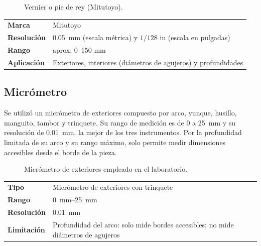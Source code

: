 \documentclass[12pt,a4paper]{article}
\begin{document}
\begin{figure}[H]
	\centering
	\caption{Vernier o pie de rey (Mitutoyo).}
\end{figure}

\begin{table}[!htb]
	\centering
	\small
	\begin{tabularx}{\linewidth}{>{\bfseries}l X}
		Marca      & Mitutoyo
		\\
		Resolución & \SI{0.05}{\milli\metre} (escala métrica) y $1/128$ in (escala
		en pulgadas)
		\\
		Rango      & aprox. 0--150 mm
		\\
		Aplicación & Exteriores, interiores (diámetros de agujeros) y profundidades
		\\
	\end{tabularx}
\end{table}

\subsection{Micrómetro}

Se utilizó un micrómetro de exteriores compuesto por arco, yunque, husillo,
manguito, tambor y trinquete. Su rango de medición es de \SI{0}{} a
\SI{25}{\milli\metre} y su resolución de \SI{0.01}{\milli\metre}, la mejor de
los tres instrumentos. Por la profundidad limitada de su arco y su rango máximo,
solo permite medir dimensiones accesibles desde el borde de la pieza.\\[-4pt]

\begin{figure}[H]
	\centering
	\caption{Micrómetro de exteriores empleado en el laboratorio.}
\end{figure}

\begin{table}[!htb]
	\centering
	\small
	\begin{tabularx}{\linewidth}{>{\bfseries}l X}
		Tipo       & Micrómetro de exteriores con trinquete                     \\
		Rango      & \SIrange{0}{25}{\milli\metre}                              \\
		Resolución & \SI{0.01}{\milli\metre}                                    \\
		Limitación & Profundidad del arco: solo mide bordes accesibles; no mide
		diámetros de agujeros                                                   \\
	\end{tabularx}
\end{table}
\end{document}
